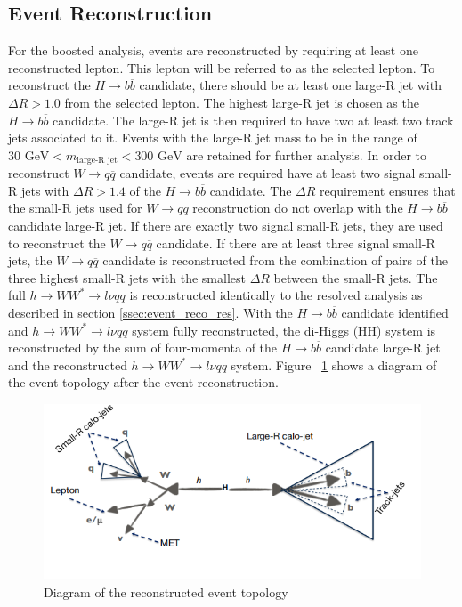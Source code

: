 \subsection{Event Reconstruction}
\label{sec:boosted_evtreco}
For the boosted analysis, events are reconstructed by requiring at least one reconstructed lepton. This lepton will be referred to as the selected lepton. To reconstruct the ${H\rightarrow b\overline{b}}$ candidate, there should be at least one large-R jet with ${\Delta{R} > 1.0}$ from the selected lepton. The highest \pT large-R jet is chosen as the ${H\rightarrow b\overline{b}}$ candidate. The large-R jet is then required to have two at least two track jets associated to it. Events with the large-R jet mass to be in the range of ${30 \text{ GeV} < m_{\textrm{large-R jet}} < 300 \text{ GeV}}$ are retained for further analysis.\newline
\indent In order to reconstruct ${W\rightarrow q\overline{q}}$ candidate, events are required have at least two signal small-R jets with ${\Delta{R} > 1.4}$ of the ${H\rightarrow b\overline{b}}$ candidate. The ${\Delta{R}}$ requirement ensures that the small-R jets used for ${W\rightarrow q\overline{q}}$ reconstruction do not overlap with the ${H\rightarrow b\overline{b}}$ candidate large-R jet. If there are exactly two signal small-R jets, they are used to reconstruct the ${W\rightarrow q\overline{q}}$ candidate. If there are at least three signal small-R jets, the ${W\rightarrow q\overline{q}}$ candidate is reconstructed from the combination of pairs of the three highest \pT small-R jets with the smallest ${\Delta{R}}$ between the small-R jets.\newline
\indent The full ${h\rightarrow WW^{*}\rightarrow l\nu qq}$ is reconstructed identically to the resolved analysis as described in section \ref{ssec:event_reco_res}.
With the ${H\rightarrow b\overline{b}}$ candidate identified and ${h\rightarrow WW^{*}\rightarrow l\nu qq}$ system fully reconstructed, the di-Higgs (HH) system is reconstructed by the sum of four-momenta of the ${H\rightarrow b\overline{b}}$ candidate large-R jet and the reconstructed ${h\rightarrow WW^{*}\rightarrow l\nu qq}$ system. Figure ~\ref{fig:boost_topo} shows a diagram of the event topology after the event reconstruction.

\begin{figure}[h]
\begin{center}
\includegraphics[scale=0.8]{figures/boosted_topo}
\caption{Diagram of the reconstructed event topology}
\label{fig:boost_topo}
\end{center}
\end{figure}

